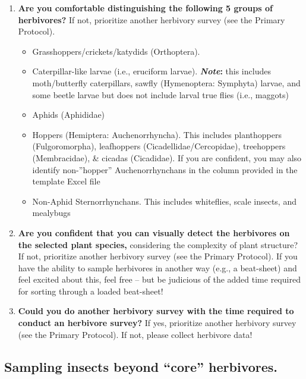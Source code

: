 \documentclass[
  letterpaper,
  DIV=11,
  numbers=noendperiod]{scrreprt}
\begin{document}
\begin{enumerate}
\def\labelenumi{\arabic{enumi}.}
\item
  \textbf{Are you comfortable distinguishing the following 5 groups of
  herbivores? }If not, prioritize another herbivory survey (see the
  Primary Protocol).

  \begin{itemize}
  \item
    Grasshoppers/crickets/katydids (Orthoptera).
  \item
    Caterpillar-like larvae (i.e., eruciform larvae).
    \textbf{\emph{Note}: }this includes moth/butterfly caterpillars,
    sawfly (Hymenoptera: Symphyta) larvae, and some beetle larvae but
    does not include larval true flies (i.e., maggots)
  \item
    Aphids (Aphididae)
  \item
    Hoppers (Hemiptera: Auchenorrhyncha). This includes planthoppers
    (Fulgoromorpha), leafhoppers (Cicadellidae/Cercopidae), treehoppers
    (Membracidae), \& cicadas (Cicadidae). If you are confident, you may
    also identify non-''hopper'' Auchenorrhynchans in the column
    provided in the template Excel file
  \item
    Non-Aphid Sternorrhynchans. This includes whiteflies, scale insects,
    and mealybugs
  \end{itemize}
\item
  \textbf{Are you confident that you can visually detect the herbivores
  on the selected plant species,} considering the complexity of plant
  structure? If not, prioritize another herbivory survey (see the
  Primary Protocol). If you have the ability to sample herbivores in
  another way (e.g., a beat-sheet) and feel excited about this, feel
  free -- but be judicious of the added time required for sorting
  through a loaded beat-sheet!
\item
  \textbf{Could you do another herbivory survey with the time required
  to conduct an herbivore survey?} If yes, prioritize another herbivory
  survey (see the Primary Protocol). If not, please collect herbivore
  data!
\end{enumerate}

\subsection{Sampling insects beyond ``core''
herbivores.}\label{sampling-insects-beyond-core-herbivores.}
\end{document}
